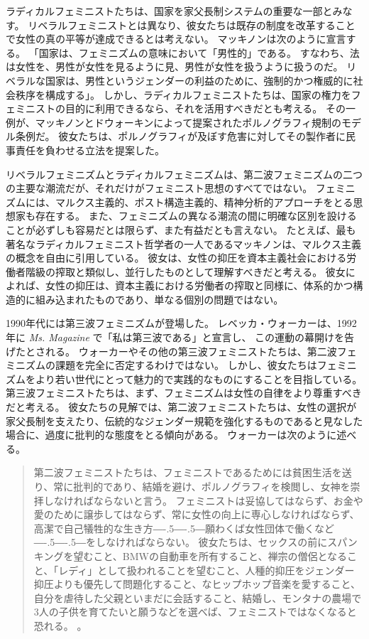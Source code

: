 \documentclass[paper=a4,book,openany]{jlreq}
\def\DDASH{―\kern-.5\zw―\kern-.5\zw―} %
\begin{document}
ラディカルフェミニストたちは、国家を家父長制システムの重要な一部とみなす。
リベラルフェミニストとは異なり、彼女たちは既存の制度を改革することで女性の真の平等が達成できるとは考えない。
マッキノンは次のように宣言する。
「国家は、フェミニズムの意味において「男性的」である。
すなわち、法は女性を、男性が女性を見るように見、男性が女性を扱うように扱うのだ。
リベラルな国家は、男性というジェンダーの利益のために、強制的かつ権威的に社会秩序を構成する」\citep[pp.161--162]{mackinnon89:_towar_femin_theor_of_state}。
しかし、ラディカルフェミニストたちは、国家の権力をフェミニストの目的に利用できるなら、それを活用すべきだとも考える。
その一例が、マッキノンとドウォーキンによって提案されたポルノグラフィ規制のモデル条例だ。
彼女たちは、ポルノグラフィが及ぼす危害に対してその製作者に民事責任を負わせる立法を提案した。

リベラルフェミニズムとラディカルフェミニズムは、第二波フェミニズムの二つの主要な潮流だが、それだけがフェミニスト思想のすべてではない。
フェミニズムには、マルクス主義的、ポスト構造主義的、精神分析的アプローチをとる思想家も存在する。
また、フェミニズムの異なる潮流の間に明確な区別を設けることが必ずしも容易だとは限らず、また有益だとも言えない。
たとえば、最も著名なラディカルフェミニスト哲学者の一人であるマッキノンは、マルクス主義の概念を自由に引用している。
彼女は、女性の抑圧を資本主義社会における労働者階級の搾取と類似し、並行したものとして理解すべきだと考える。
彼女によれば、女性の抑圧は、資本主義における労働者の搾取と同様に、体系的かつ構造的に組み込まれたものであり、単なる個別の問題ではない\citep[p.515]{mackinnon82:_femin_marx_meth_stat}。

1990年代には第三波フェミニズムが登場した\citep[cf.][]{snyder08:_what_is_thir_wave_femin}。
レベッカ・ウォーカーは、1992年に \emph{Ms. Magazine} で「私は第三波である」と宣言し\citep{walker92:_becom_thir_wave}、
この運動の幕開けを告げたとされる。
ウォーカーやその他の第三波フェミニストたちは、第二波フェミニズムの課題を完全に否定するわけではない。
しかし、彼女たちはフェミニズムをより若い世代にとって魅力的で実践的なものにすることを目指している。
第三波フェミニストたちは、まず、フェミニズムは女性の自律をより尊重すべきだと考える。
彼女たちの見解では、第二波フェミニストたちは、女性の選択が家父長制を支えたり、伝統的なジェンダー規範を強化するものであると見なした場合に、過度に批判的な態度をとる傾向がある\citep[p.xxii]{hernández02:_colon_this}。
ウォーカーは次のように述べる。

\begin{quote}
  第二波フェミニストたちは、フェミニストであるためには貧困生活を送り、常に批判的であり、結婚を避け、ポルノグラフィを検閲し、女神を崇拝しなければならないと言う。
フェミニストは妥協してはならず、お金や愛のために譲歩してはならず、常に女性の向上に専心しなければならず、高潔で自己犠牲的な生き方{\DDASH}願わくば女性団体で働くなど{\DDASH}をしなければならない。
彼女たちは、セックスの前にスパンキングを望むこと、BMWの自動車を所有すること、禅宗の僧侶となること、「レディ」として扱われることを望むこと、人種的抑圧をジェンダー抑圧よりも優先して問題化すること、なヒップホップ音楽を愛すること、自分を虐待した父親といまだに会話すること、結婚し、モンタナの農場で3人の子供を育てたいと願うなどを選べば、フェミニストではなくなると恐れる。
\citep[p.xxxii]{walker95:_to_be_real}。
\end{quote}
\end{document}
